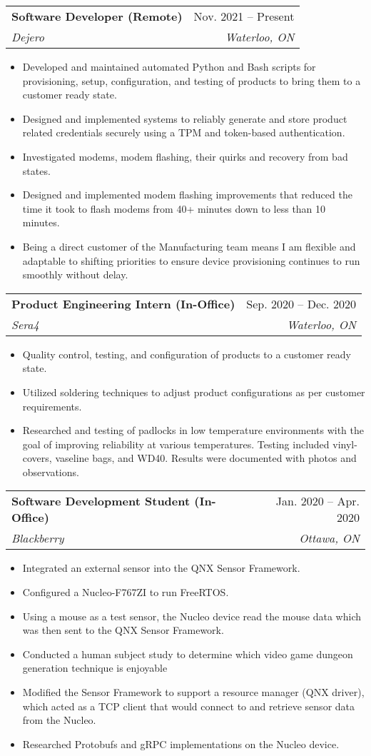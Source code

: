 \documentclass[letterpaper,11pt]{article}
\makeatletter
\newcommand{\resumeItem}[1]{
  \item\small{
    {#1 \vspace{-2pt}}
  }
}
\newcommand{\resumeSubheading}[4]{
  \vspace{-2pt}\item
    \begin{tabular*}{0.97\textwidth}[t]{l@{\extracolsep{\fill}}r}
      \textbf{#1} & #2 \\
      \textit{\small#3} & \textit{\small #4} \\
    \end{tabular*}\vspace{-7pt}
}
\newcommand{\resumeItemListStart}{\begin{itemize}}
\newcommand{\resumeItemListEnd}{\end{itemize}\vspace{-5pt}}
\makeatother
\begin{document}
    \resumeSubheading
      {Software Developer (Remote)}{Nov. 2021 -- Present}
      {Dejero}{Waterloo, ON}
      \resumeItemListStart
        \resumeItem{Developed and maintained automated Python and Bash scripts for provisioning, setup, configuration, and testing of products to bring them to a customer ready state.}
        \resumeItem{Designed and implemented systems to reliably generate and store product related credentials securely using a TPM and token-based authentication.}
        \resumeItem{Investigated modems, modem flashing, their quirks and recovery from bad states.}
        \resumeItem{Designed and implemented modem flashing improvements that reduced the time it took to flash modems from 40+ minutes down to less than 10 minutes.}
        \resumeItem{Being a direct customer of the Manufacturing team means I am flexible and adaptable to shifting priorities to ensure device provisioning continues to run smoothly without delay.}
      \resumeItemListEnd

    \resumeSubheading
      {Product Engineering Intern (In-Office)}{Sep. 2020 -- Dec. 2020}
      {Sera4}{Waterloo, ON}
      \resumeItemListStart
        \resumeItem{Quality control, testing, and configuration of products to a customer ready state.}
        \resumeItem{Utilized soldering techniques to adjust product configurations as per customer requirements.}
        \resumeItem{Researched and testing of padlocks in low temperature environments with the goal of improving reliability at various temperatures. Testing included vinyl-covers, vaseline bags, and WD40. Results were documented with photos and observations.}
    \resumeItemListEnd

    \resumeSubheading
      {Software Development Student (In-Office)}{Jan. 2020 -- Apr. 2020}
      {Blackberry}{Ottawa, ON}
      \resumeItemListStart
        \resumeItem{Integrated an external sensor into the QNX Sensor Framework.}
        \resumeItem{Configured a Nucleo-F767ZI to run FreeRTOS.}
        \resumeItem{Using a mouse as a test sensor, the Nucleo device read the mouse data which was then sent to the QNX Sensor Framework.}
        \resumeItem{Conducted  a human subject study to determine which video game dungeon generation technique is enjoyable}
        \resumeItem{Modified the Sensor Framework to support a resource manager (QNX driver), which acted as a TCP client that would connect to and retrieve sensor data from the Nucleo.}
        \resumeItem{Researched Protobufs and gRPC implementations on the Nucleo device.}
      \resumeItemListEnd
\end{document}
